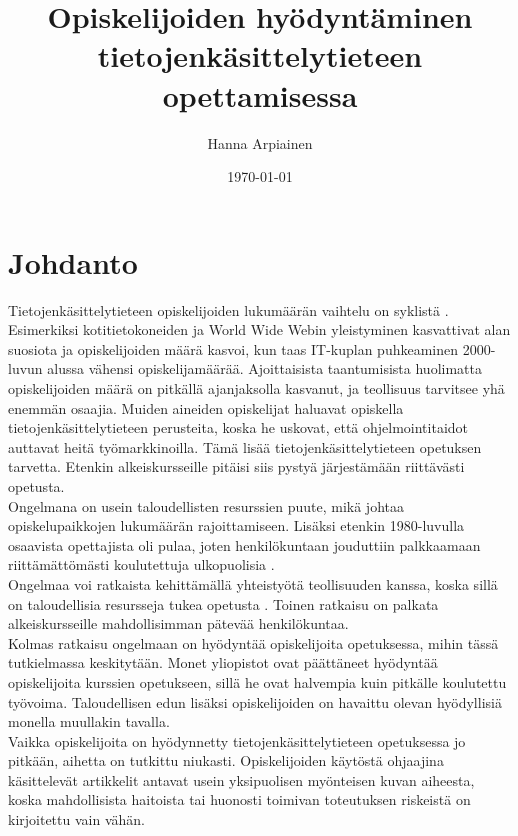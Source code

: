 \documentclass[finnish]{tktltiki2}
\title{﻿Opiskelijoiden hyödyntäminen tietojenkäsittelytieteen opettamisessa}
\author{Hanna Arpiainen}
\date{\today}
\theoremstyle{definition}
\theoremstyle{remark}
\begin{document}
\maketitle
\makeabstract

\tableofcontents
\newpage





\section{Johdanto}
Tietojenkäsittelytieteen opiskelijoiden lukumäärän vaihtelu on syklistä \cite{Roberts11}. Esimerkiksi kotitietokoneiden ja World Wide Webin yleistyminen kasvattivat alan suosiota ja opiskelijoiden määrä kasvoi, kun taas IT-kuplan puhkeaminen 2000-luvun alussa vähensi opiskelijamäärää. Ajoittaisista taantumisista huolimatta opiskelijoiden määrä on pitkällä ajanjaksolla kasvanut, ja teollisuus tarvitsee yhä enemmän osaajia. Muiden aineiden opiskelijat haluavat opiskella tietojenkäsittelytieteen perusteita, koska he uskovat, että ohjelmointitaidot auttavat heitä työmarkkinoilla. Tämä lisää tietojenkäsittelytieteen opetuksen tarvetta. Etenkin alkeiskursseille pitäisi siis pystyä järjestämään riittävästi opetusta. 
\\
Ongelmana on usein taloudellisten resurssien puute, mikä johtaa opiskelupaikkojen lukumäärän rajoittamiseen. Lisäksi etenkin 1980-luvulla osaavista opettajista oli pulaa, joten henkilökuntaan jouduttiin palkkaamaan riittämättömästi koulutettuja ulkopuolisia \cite{Roberts11}. 
\\
Ongelmaa voi ratkaista kehittämällä yhteistyötä teollisuuden kanssa, koska sillä on taloudellisia resursseja tukea opetusta \cite{Roberts11}. Toinen ratkaisu on palkata alkeiskursseille mahdollisimman pätevää henkilökuntaa. 
\\
Kolmas ratkaisu ongelmaan on hyödyntää opiskelijoita opetuksessa, mihin tässä tutkielmassa keskitytään. Monet yliopistot ovat päättäneet hyödyntää opiskelijoita kurssien opetukseen, sillä he ovat halvempia kuin pitkälle koulutettu työvoima. Taloudellisen edun lisäksi opiskelijoiden on havaittu olevan hyödyllisiä monella muullakin tavalla.
\\
Vaikka opiskelijoita on hyödynnetty tietojenkäsittelytieteen opetuksessa jo pitkään, aihetta on tutkittu niukasti. Opiskelijoiden käytöstä ohjaajina käsittelevät artikkelit antavat usein yksipuolisen myönteisen kuvan aiheesta, koska mahdollisista haitoista tai huonosti toimivan toteutuksen riskeistä on kirjoitettu vain vähän. 
\end{document}
